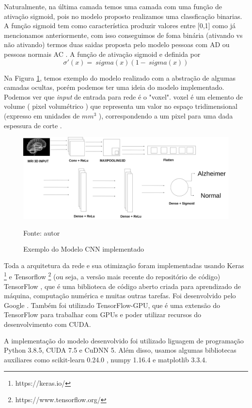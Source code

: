 \documentclass[openright]{UFRGS} %
\begin{document}
Naturalmente, na última camada temos uma camada com uma função de ativação sigmoid, pois no modelo proposto realizamos uma classficação binarias. A função sigmoid tem como característica produzir valores entre [0,1] como já mencionamos anteriormente, com isso conseguimos de foma binária (ativando vs não ativando) termos duas saidas proposta pelo modelo pessoas com AD ou pessoas normais AC . A função de ativação sigmoid e definida por  $$ \sigma '(x) = \ sigma (x) (1 - \ sigma (x)) $$


Na Figura  \ref{fig:cnnmodel}, temos  exemplo do modelo realizado com a abstração de algumas camadas ocultas, porém podemos ter uma ideia do modelo implementado. 
Podemos ver  que \textit{input} de entrada para rede é o "voxel". voxel é um elemento de volume ( pixel volumétrico ) que representa um valor no espaço tridimensional (expresso em unidades de  ${mm^3}$ ), correspondendo a um pixel para uma dada espessura de corte \cite{watkins2001structural}.

\begin{figure}[h]
    \centering
    \caption{Exemplo do Modelo CNN implementado}
    \includegraphics[scale=0.20]{cnn3d.png}
    \centerline{Fonte: autor}
    \label{fig:cnnmodel}
\end{figure}



Toda a arquitetura da rede e sua otimização foram implementadas usando Keras \footnote[1]{https://keras.io/}  e  Tensorflow \footnote[2]{https://www.tensorflow.org/}  (ou seja, a versão mais recente do repositório de código) TensorFlow  , que é uma biblioteca de código aberto criada para aprendizado de máquina, computação numérica e muitas outras tarefas. Foi desenvolvido pelo Google \cite{abadi2016tensorflow}. Também  foi utilizado  TensorFlow-GPU, que é uma extensão do TensorFlow para trabalhar com GPUs e poder utilizar  recursos do desenvolvimento com CUDA. 

A implementação do modelo desenvolvido foi utilizado liguagem de programação Python 3.8.5, CUDA 7.5 e CuDNN 5. Além disso, usamos algumas bibliotecas auxiliares como scikit-learn 0.24.0 , numpy 1.16.4 e matplotlib 3.3.4. 
\end{document}
